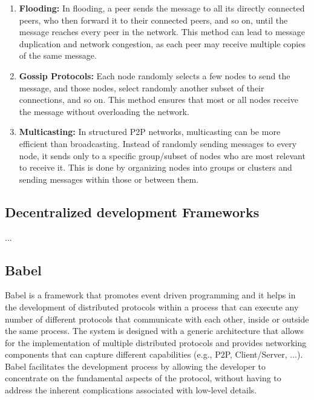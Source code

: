 \begin{enumerate}

  \item \textbf{Flooding:} In flooding, a peer sends the message to all its directly connected peers, who then forward it to their connected peers, and so on, until the message reaches every peer in the network. This method can lead to message duplication and network congestion, as each peer may receive multiple copies of the same message.
  \item \textbf{Gossip Protocols:} Each node randomly selects a few nodes to send the message, and those nodes, select randomly another subset of their connections, and so on. This method ensures that most or all nodes receive the message without overloading the network.
  \item \textbf{Multicasting:} In structured \gls{P2P} networks, multicasting can be more efficient than broadcasting. Instead of randomly sending messages to every node, it sends only to a specific group/subset of nodes who are most relevant to receive it. This is done by organizing nodes into groups or clusters and sending messages within those or between them.

\end{enumerate}



\subsection{Decentralized development Frameworks}
\label{sub:decentralized_development_frameworks}

... 

\subsection{Babel}
\label{sub:babel}

Babel is a framework that promotes event driven programming and it helps in the development of distributed protocols within a process that can execute any number of different protocols that communicate with each other, inside or outside the same process. The system is designed with a generic architecture that allows for the implementation of multiple distributed protocols and provides networking components that can capture different capabilities (e.g., \gls{P2P}, Client/Server, ...). 
Babel facilitates the development process by allowing the developer to concentrate on the fundamental aspects of the protocol, without having to address the inherent complications associated with low-level details.

